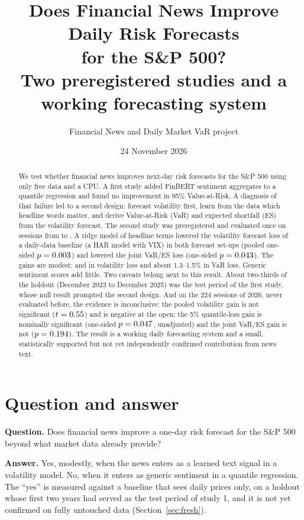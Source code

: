 \documentclass[11pt,a4paper]{article}
\title{\textbf{Does Financial News Improve Daily Risk Forecasts\\ for the S\&P 500?}\\[4pt]
\large Two preregistered studies and a working forecasting system}
\author{Financial News and Daily Market VaR project}
\date{24 November 2026}
\begin{document}
\maketitle

\begin{abstract}
\noindent We test whether financial news improves next-day risk forecasts for the S\&P 500 using
only free data and a CPU. A first study added FinBERT sentiment aggregates to a quantile
regression and found no improvement in 95\% Value-at-Risk. A diagnosis of that failure led to
a second design: forecast volatility first, learn from the data which headline words matter,
and derive Value-at-Risk (VaR) and expected shortfall (ES) from the volatility forecast.
The second study was preregistered and evaluated once on \PooledHoldQlikeN{} sessions from
\HoldoutStart{} to \HoldoutEnd{}. A ridge model of headline terms lowered the volatility
forecast loss of a daily-data baseline (a HAR model with VIX) in both forecast set-ups (pooled
one-sided $p=0.003$) and lowered the joint VaR/ES loss (one-sided $p=0.043$). The gains are
modest: \HoldPreQlikeGain{} and \HoldOpenQlikeGain{} in volatility loss and about 1.3--1.5\%
in VaR loss. Generic sentiment scores add little. Two caveats belong next to this result.
About two-thirds of the holdout (December 2023 to December 2025) was the test period of the
first study, whose null result prompted the second design. And on the 224 sessions of 2026,
never evaluated before, the evidence is inconclusive: the pooled volatility gain is not
significant ($t=0.55$) and is negative at the open; the 5\% quantile-loss gain
is nominally significant (one-sided $p=0.047$, unadjusted) and the joint VaR/ES
gain is not ($p=0.194$). The result is a working daily forecasting system and a
small, statistically supported but not yet independently confirmed contribution from news text.
\end{abstract}

\section{Question and answer}

\textbf{Question.} Does financial news improve a one-day risk forecast for the S\&P 500 beyond
what market data already provide?

\textbf{Answer.} Yes, modestly, when the news enters as a learned text signal in a volatility
model. No, when it enters as generic sentiment in a quantile regression. The ``yes'' is measured
against a baseline that sees daily prices only, on a holdout whose first two years had served
as the test period of study 1, and it is not yet confirmed on fully untouched data
(Section~\ref{sec:fresh}).
\end{document}
